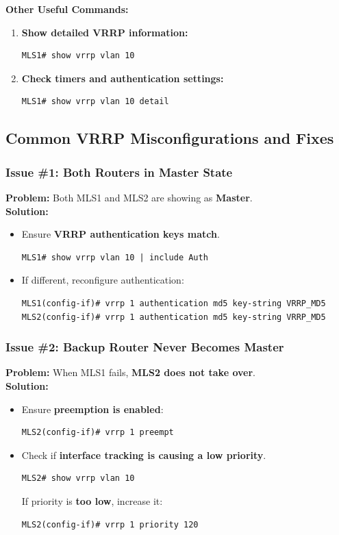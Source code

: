 \documentclass[a4paper]{book}
\begin{document}
\textbf{Other Useful Commands:}
\begin{enumerate}
\item \textbf{Show detailed VRRP information:}
\begin{lstlisting}
MLS1# show vrrp vlan 10
\end{lstlisting}

\item \textbf{Check timers and authentication settings:}
\begin{lstlisting}
MLS1# show vrrp vlan 10 detail
\end{lstlisting}
\end{enumerate}

\subsection{Common VRRP Misconfigurations and Fixes}

\subsubsection{Issue \#1: Both Routers in Master State}
\textbf{Problem:} Both MLS1 and MLS2 are showing as \textbf{Master}.\\
\textbf{Solution:}
\begin{itemize}
\item Ensure \textbf{VRRP authentication keys match}.
\begin{lstlisting}
MLS1# show vrrp vlan 10 | include Auth
\end{lstlisting}
\item If different, reconfigure authentication:
\begin{lstlisting}
MLS1(config-if)# vrrp 1 authentication md5 key-string VRRP_MD5
MLS2(config-if)# vrrp 1 authentication md5 key-string VRRP_MD5
\end{lstlisting}
\end{itemize}

\subsubsection{Issue \#2: Backup Router Never Becomes Master}
\textbf{Problem:} When MLS1 fails, \textbf{MLS2 does not take over}.\\
\textbf{Solution:}
\begin{itemize}
\item Ensure \textbf{preemption is enabled}:
\begin{lstlisting}
MLS2(config-if)# vrrp 1 preempt
\end{lstlisting}
\item Check if \textbf{interface tracking is causing a low priority}.
\begin{lstlisting}
MLS2# show vrrp vlan 10
\end{lstlisting}
If priority is \textbf{too low}, increase it:
\begin{lstlisting}
MLS2(config-if)# vrrp 1 priority 120
\end{lstlisting}
\end{itemize}
\end{document}
